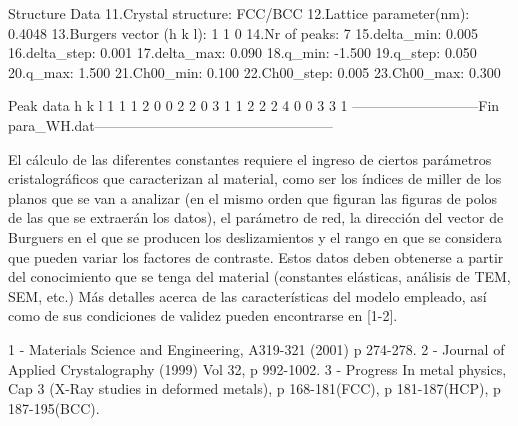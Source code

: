 Structure Data
11.Crystal structure:      FCC/BCC
12.Lattice parameter(nm):  0.4048
13.Burgers vector (h k l): 1 1 0
14.Nr of peaks:   7
15.delta_min:     0.005
16.delta_step:    0.001
17.delta_max:     0.090
18.q_min:        -1.500
19.q_step:        0.050
20.q_max:         1.500
21.Ch00_min:      0.100
22.Ch00_step:     0.005
23.Ch00_max:      0.300

Peak data
h k l
1 1 1
2 0 0
2 2 0
3 1 1
2 2 2
4 0 0
3 3 1
---------------------------Fin para_WH.dat---------------------------------------------------

El cálculo de las diferentes constantes requiere el ingreso de ciertos parámetros cristalográficos que caracterizan al material, como ser los índices de miller de los planos que se van a analizar (en el mismo orden que figuran las figuras de polos de las que se extraerán los datos), el parámetro de red, la dirección del vector de Burguers en el que se producen los deslizamientos y el rango en que se considera que pueden variar los factores de contraste.
Estos datos deben obtenerse a partir del conocimiento que se tenga del material (constantes elásticas, análisis de TEM, SEM, etc.)
Más detalles acerca de las características del modelo empleado, así como de sus condiciones de validez pueden encontrarse en [1-2].

1 - Materials Science and Engineering, A319-321 (2001) p 274-278.
2 - Journal of Applied Crystalography (1999) Vol 32, p 992-1002.
3 - Progress In metal physics, Cap 3 (X-Ray studies in deformed metals), p 168-181(FCC), p 181-187(HCP), p 187-195(BCC).
